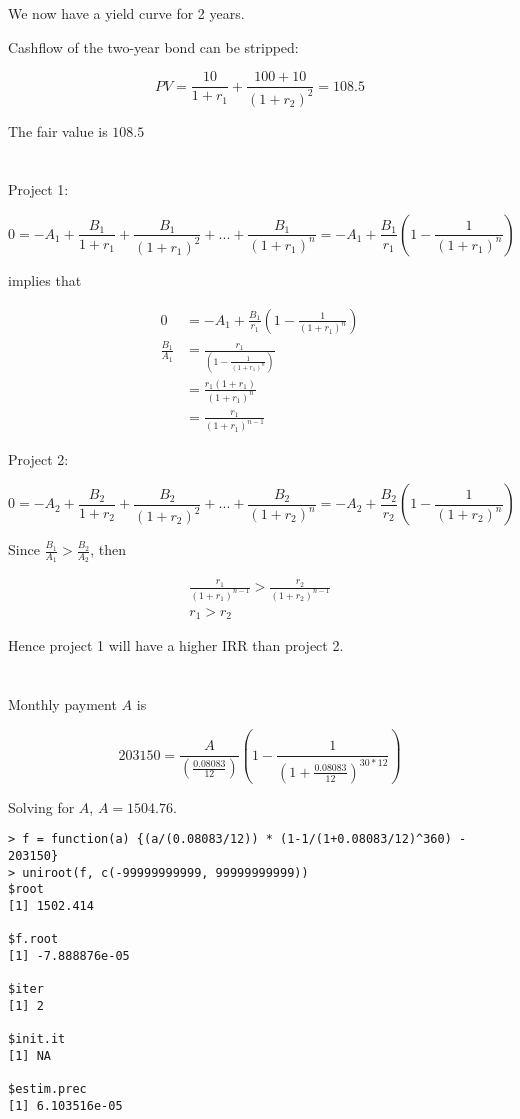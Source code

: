 \documentclass[11pt]{scrartcl}
\begin{document}
We now have a yield curve for 2 years.

Cashflow of the two-year bond can be stripped:

\[PV = \frac{10}{1+r_1} + \frac{100 + 10}{(1+r_2)^2} = 108.5\]

The fair value is $108.5$

\section{}

Project 1:

\[0 = -A_1 + \frac{B_1}{1+r_1} + \frac{B_1}{(1+r_1)^2} + ... + \frac{B_1}{(1+r_1)^n} = -A_1 + \frac{B_1}{r_1} \left(1-\frac{1}{(1+r_1)^n}\right)\]

implies that

\begin{align*}
0 &= -A_1 + \frac{B_1}{r_1} \left(1-\frac{1}{(1+r_1)^n} \right)\\
\frac{B_1}{A_1} &= \frac{r_1}{\left(1-\frac{1}{(1+r_1)^n} \right)} \\
&= \frac{r_1 (1+r_1)}{(1+r_1)^n} \\
&= \frac{r_1}{(1+r_1)^{n-1}}
\end{align*}

Project 2:

\[0 = -A_2 + \frac{B_2}{1+r_2} + \frac{B_2}{(1+r_2)^2} + ... + \frac{B_2}{(1+r_2)^n} = -A_2 + \frac{B_2}{r_2} \left(1-\frac{1}{(1+r_2)^n}\right)\]

Since $\frac{B_1}{A_1} > \frac{B_2}{A_2}$, then

\begin{align*}
\frac{r_1}{(1+r_1)^{n-1}} > \frac{r_2}{(1+r_2)^{n-1}}\\
r_1 > r_2
\end{align*}

Hence project 1 will have a higher IRR than project 2.

\section{}

Monthly payment $A$ is

\[203150 = \frac{A}{\left( \frac{0.08083}{12} \right)} \left(1 - \frac{1}{\left(1+\frac{0.08083}{12}\right)^{30*12}} \right)\]

Solving for $A$, $A = 1504.76$.

\begin{lstlisting}
> f = function(a) {(a/(0.08083/12)) * (1-1/(1+0.08083/12)^360) - 203150}
> uniroot(f, c(-99999999999, 99999999999))
$root
[1] 1502.414

$f.root
[1] -7.888876e-05

$iter
[1] 2

$init.it
[1] NA

$estim.prec
[1] 6.103516e-05
\end{lstlisting}
\end{document}
